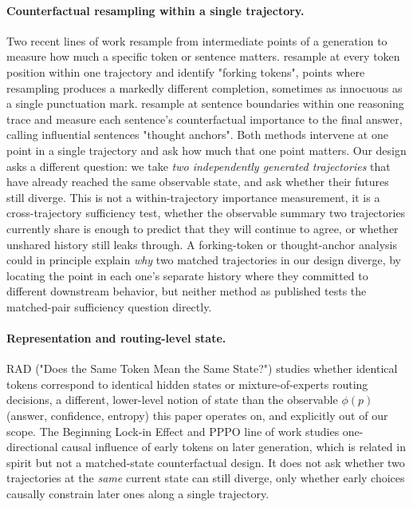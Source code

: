 \documentclass{article}
\begin{document}
\paragraph{Counterfactual resampling within a single trajectory.} Two recent lines of work resample from intermediate points of a generation to measure how much a specific token or sentence matters. \citet{forkingpaths2024} resample at every token position within one trajectory and identify "forking tokens", points where resampling produces a markedly different completion, sometimes as innocuous as a single punctuation mark. \citet{thoughtanchors2025} resample at sentence boundaries within one reasoning trace and measure each sentence's counterfactual importance to the final answer, calling influential sentences "thought anchors". Both methods intervene at one point in a single trajectory and ask how much that one point matters. Our design asks a different question: we take \emph{two independently generated trajectories} that have already reached the same observable state, and ask whether their futures still diverge. This is not a within-trajectory importance measurement, it is a cross-trajectory sufficiency test, whether the observable summary two trajectories currently share is enough to predict that they will continue to agree, or whether unshared history still leaks through. A forking-token or thought-anchor analysis could in principle explain \emph{why} two matched trajectories in our design diverge, by locating the point in each one's separate history where they committed to different downstream behavior, but neither method as published tests the matched-pair sufficiency question directly.

\paragraph{Representation and routing-level state.} RAD \citep{rad2026} ("Does the Same Token Mean the Same State?") studies whether identical tokens correspond to identical hidden states or mixture-of-experts routing decisions, a different, lower-level notion of state than the observable $\phi(p)$ (answer, confidence, entropy) this paper operates on, and explicitly out of our scope. The Beginning Lock-in Effect and PPPO line of work \citep{pppo2025} studies one-directional causal influence of early tokens on later generation, which is related in spirit but not a matched-state counterfactual design. It does not ask whether two trajectories at the \emph{same} current state can still diverge, only whether early choices causally constrain later ones along a single trajectory.
\end{document}
